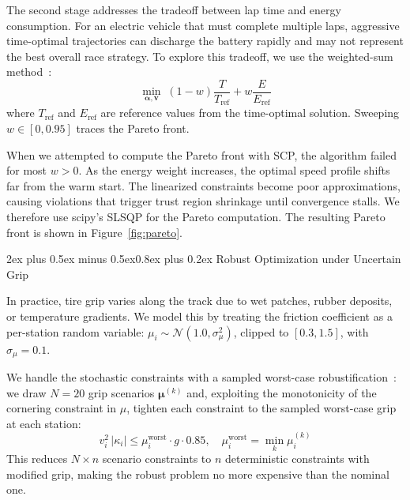 \documentclass[conf]{new-aiaa}
\makeatletter
\renewcommand\section{\@startsection{section}{1}{\z@}%
  {2ex plus 0.5ex minus 0.5ex}{0.8ex plus 0.2ex}%
  {\normalfont\large\bfseries\centering}}
\makeatother
\begin{document}
The second stage addresses the tradeoff between lap time and energy consumption. For an electric
vehicle that must complete multiple laps, aggressive time-optimal trajectories can discharge the
battery rapidly and may not represent the best overall race strategy. To explore this tradeoff, we
use the weighted-sum method~\cite{Kochenderfer2019}:
\begin{equation}\label{eq:pareto}
  \min_{\boldsymbol{\alpha}, \mathbf{v}} \; (1-w) \frac{T}{T_{\text{ref}}} + w \frac{E}{E_{\text{ref}}}
\end{equation}
where $T_{\text{ref}}$ and $E_{\text{ref}}$ are reference values from the time-optimal solution.
Sweeping $w \in [0, 0.95]$ traces the Pareto front.

When we attempted to compute the Pareto front with SCP, the algorithm failed for most $w > 0$. As
the energy weight increases, the optimal speed profile shifts far from the warm start. The
linearized constraints become poor approximations, causing violations that trigger trust region
shrinkage until convergence stalls. We therefore use scipy's SLSQP for the Pareto computation.
The resulting Pareto front is shown in Figure~\ref{fig:pareto}.

\section{Robust Optimization under Uncertain Grip}

In practice, tire grip varies along the track due to wet patches, rubber deposits, or temperature
gradients. We model this by treating the friction coefficient as a per-station random variable:
$\mu_i \sim \mathcal{N}(1.0, \sigma_\mu^2)$, clipped to $[0.3, 1.5]$, with $\sigma_\mu = 0.1$.

We handle the stochastic constraints with a sampled worst-case robustification~\cite{Kochenderfer2019}:
we draw $N = 20$ grip scenarios $\boldsymbol{\mu}^{(k)}$ and, exploiting the monotonicity of the
cornering constraint in $\mu$, tighten each constraint to the sampled worst-case grip at each station:
\begin{equation}\label{eq:worst_case_robust}
  v_i^2 \, |\kappa_i| \leq \mu_i^{\text{worst}} \cdot g \cdot 0.85,
  \quad \mu_i^{\text{worst}} = \min_{k} \mu_i^{(k)}
\end{equation}
This reduces $N \times n$ scenario constraints to $n$ deterministic constraints with modified grip,
making the robust problem no more expensive than the nominal one.
\end{document}
